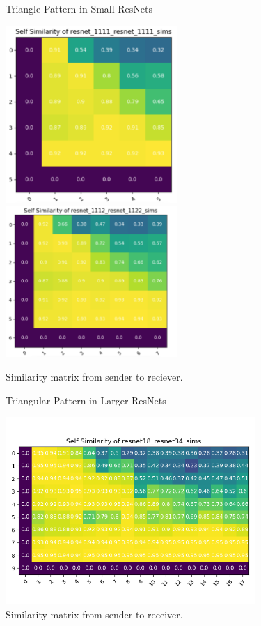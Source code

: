 \documentclass{article} %
\begin{document}
\label{Figure2}
\begin{center}
   \begin{figure}[h!]
      \centering
      \caption{Triangle Pattern in Small ResNets}
      \includegraphics[width=6.5cm]{resnet1111_1111.png}
      \includegraphics[width=6.5cm]{resnet1112_1122.png}
      \caption*{Similarity matrix from sender to reciever.}
   \end{figure}
\end{center}

\label{Figure3}
\begin{center}
   \begin{figure}[h!]
      \centering
      \caption{Triangular Pattern in Larger ResNets}
      \includegraphics[width=9.5cm]{resnet18_resnet34_sims.png}
      \caption*{Similarity matrix from sender to receiver.}
   \end{figure}
\end{center}
\end{document}
